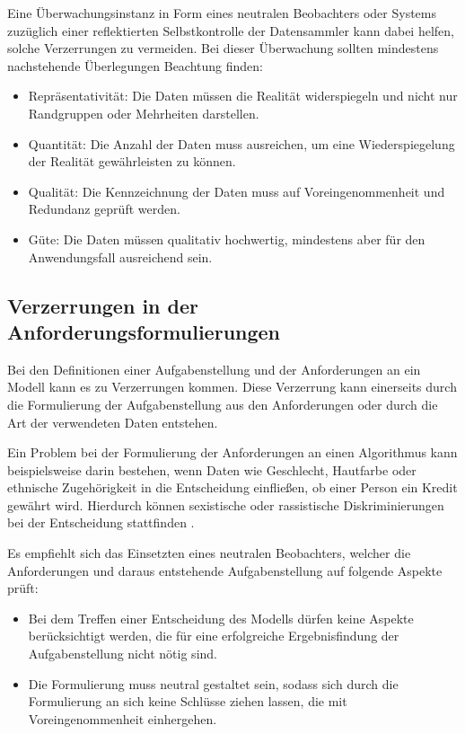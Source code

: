 \documentclass[12pt]{report}
\begin{document}
Eine Überwachungsinstanz in Form eines neutralen Beobachters oder Systems zuzüglich einer reflektierten Selbstkontrolle der Datensammler kann dabei helfen, solche Verzerrungen zu vermeiden.
Bei dieser Überwachung sollten mindestens nachstehende Überlegungen Beachtung finden: %
\begin{itemize}

    \item Repräsentativität: Die Daten müssen die Realität widerspiegeln und nicht nur Randgruppen oder Mehrheiten darstellen.
    \item Quantität: Die Anzahl der Daten muss ausreichen,  um eine Wiederspiegelung der Realität gewährleisten zu können.
    \item Qualität: Die Kennzeichnung der Daten muss auf Voreingenommenheit und Redundanz geprüft werden.
    \item Güte: Die Daten müssen qualitativ hochwertig, mindestens aber für den Anwendungsfall ausreichend sein.

\end{itemize}

\subsection{Verzerrungen in der Anforderungsformulierungen}
Bei den Definitionen einer Aufgabenstellung und der Anforderungen an ein Modell kann es zu Verzerrungen kommen. Diese Verzerrung kann einerseits durch die Formulierung der Aufgabenstellung aus den Anforderungen oder durch die Art der verwendeten Daten entstehen.  \cite[S. 51f.]{Srinivasan} 

Ein Problem bei der Formulierung der Anforderungen an einen Algorithmus kann beispielsweise darin bestehen, wenn Daten wie Geschlecht, Hautfarbe oder ethnische Zugehörigkeit in die Entscheidung einfließen, ob einer Person ein Kredit gewährt wird. Hierdurch können sexistische oder rassistische Diskriminierungen bei der Entscheidung stattfinden \cite[S. 51f.]{Srinivasan}.

Es empfiehlt sich das Einsetzten eines neutralen Beobachters, welcher die Anforderungen und daraus entstehende Aufgabenstellung auf folgende Aspekte prüft: %
\begin{itemize}
    \item Bei dem Treffen einer Entscheidung des Modells dürfen keine Aspekte berücksichtigt werden, die für eine erfolgreiche Ergebnisfindung der Aufgabenstellung nicht nötig sind.
    \item Die Formulierung muss neutral gestaltet sein, sodass sich durch die Formulierung an sich keine Schlüsse ziehen lassen, die mit Voreingenommenheit einhergehen.
\end{itemize}
\end{document}

